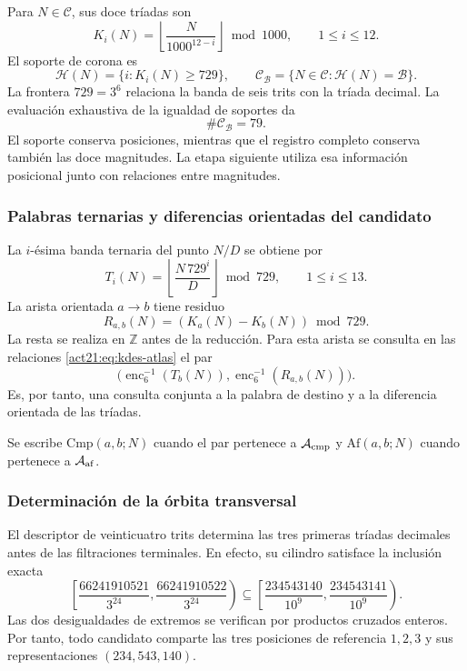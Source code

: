 Para $N\in\mathcal C$, sus doce tríadas son
\begin{equation}
 K_i(N)=\left\lfloor\frac{N}{1000^{12-i}}\right\rfloor\bmod1000,
 \qquad1\leq i\leq12.
 \label{act21:eq:kdes-triadas}
\end{equation}
El soporte de corona es
\[
 \mathcal H(N)=\{i:K_i(N)\geq729\},
 \qquad
 \mathcal C_{\mathcal B}=\{N\in\mathcal C:\mathcal H(N)=\mathcal B\}.
\]
La frontera $729=3^6$ relaciona la banda de seis trits con la tríada
decimal. La evaluación exhaustiva de la igualdad de soportes da
\begin{equation}
 \#\mathcal C_{\mathcal B}=79.
 \label{act21:eq:kdes-79}
\end{equation}
El soporte conserva posiciones, mientras que el registro completo
conserva también las doce magnitudes. La etapa siguiente utiliza esa
información posicional junto con relaciones entre magnitudes.

\subsubsection{Palabras ternarias y diferencias orientadas del candidato}

La $i$-ésima banda ternaria del punto $N/D$ se obtiene por
\begin{equation}
 T_i(N)=\left\lfloor\frac{N\,729^i}{D}\right\rfloor\bmod729,
 \qquad1\leq i\leq13.
 \label{act21:eq:kdes-tercandidato}
\end{equation}
La arista orientada $a\to b$ tiene residuo
\begin{equation}
 R_{a,b}(N)=(K_a(N)-K_b(N))\bmod729.
 \label{act21:eq:kdes-resarista}
\end{equation}
La resta se realiza en $\mathbb Z$ antes de la reducción. Para esta
arista se consulta en las relaciones \eqref{act21:eq:kdes-atlas} el par
\[
 \bigl(\operatorname{enc}_6^{-1}(T_b(N)),
  \operatorname{enc}_6^{-1}(R_{a,b}(N))\bigr).
\]
Es, por tanto, una consulta
conjunta a la palabra de destino y a la diferencia orientada de las
tríadas.

Se escribe $\mathrm{Cmp}(a,b;N)$ cuando el par pertenece a
$\mathcal A_{\rm cmp}$ y $\mathrm{Af}(a,b;N)$ cuando pertenece a
$\mathcal A_{\rm af}$.

\subsubsection{Determinación de la órbita transversal}

El descriptor de veinticuatro trits determina las tres primeras
tríadas decimales antes de las filtraciones terminales. En efecto, su
cilindro satisface la inclusión exacta
\[
 \left[\frac{66241910521}{3^{24}},
       \frac{66241910522}{3^{24}}\right)
 \subseteq
 \left[\frac{234543140}{10^9},
       \frac{234543141}{10^9}\right).
\]
Las dos desigualdades de extremos se verifican por productos cruzados
enteros. Por tanto, todo candidato comparte las tres posiciones de
referencia $1,2,3$ y sus representaciones $(234,543,140)$.

